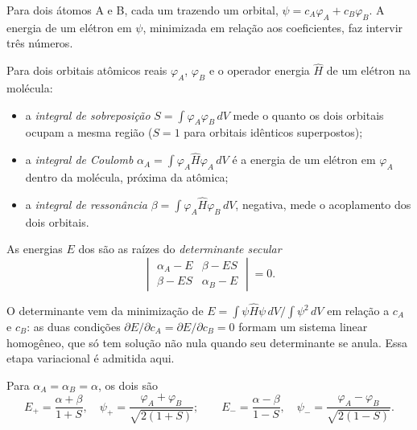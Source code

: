 Para dois átomos A e B, cada um trazendo um orbital, $\psi = c_A\varphi_A + c_B\varphi_B$.
A energia de um elétron em $\psi$, minimizada em relação aos coeficientes,
faz intervir três números.

\begin{definition}\label{def:b2:diatomic-mos:integrals}
Para dois orbitais atômicos reais $\varphi_A$, $\varphi_B$ e o operador energia $\hat H$
de um elétron na molécula:
\begin{itemize}
  \item a \emph{integral de sobreposição} $S = \int\varphi_A\varphi_B\,dV$
        mede o quanto os dois orbitais ocupam a mesma região ($S = 1$ para
        orbitais idênticos superpostos);
  \item a \emph{integral de Coulomb} $\alpha_A = \int\varphi_A\hat
        H\varphi_A\,dV$ é a energia de um elétron em $\varphi_A$ dentro da molécula,
        próxima da  atômica;
  \item a \emph{integral de ressonância} $\beta = \int\varphi_A\hat
        H\varphi_B\,dV$, negativa, mede o acoplamento dos dois orbitais.
\end{itemize}
As energias $E$ dos  são as raízes do \emph{determinante
secular}
\[
  \begin{vmatrix} \alpha_A - E & \beta - ES \\ \beta - ES & \alpha_B - E \end{vmatrix} = 0 .
\]
\end{definition}

O determinante vem da minimização de $E = \int\psi\hat H\psi\,dV/\int\psi^2\,dV$
em relação a $c_A$ e $c_B$: as duas condições $\partial E/\partial c_A =
\partial E/\partial c_B = 0$ formam um sistema linear homogêneo, que só tem
solução não nula quando seu determinante se anula. Essa etapa variacional é
admitida aqui.

\begin{theorem}\label{thm:b2:diatomic-mos:homonuclear}
Para $\alpha_A = \alpha_B = \alpha$, os dois  são
\[
  E_+ = \frac{\alpha + \beta}{1 + S}, \quad \psi_+ = \frac{\varphi_A + \varphi_B}{\sqrt{2(1 + S)}} ;
  \qquad
  E_- = \frac{\alpha - \beta}{1 - S}, \quad \psi_- = \frac{\varphi_A - \varphi_B}{\sqrt{2(1 - S)}} .
\]
\end{theorem}


